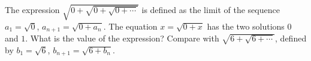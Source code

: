 The expression $\sqrt{0+\sqrt{0+\sqrt{0+\cdots}}}$ is defined as the limit of the sequence $a_1=\sqrt0$, $a_{n+1}=\sqrt{0+a_n}$. The equation $x=\sqrt{0+x}$ has the two solutions $0$ and $1$. What is the value of the expression? Compare with $\sqrt{6+\sqrt{6+\cdots}}$, defined by $b_1=\sqrt6$, $b_{n+1}=\sqrt{6+b_n}$.
